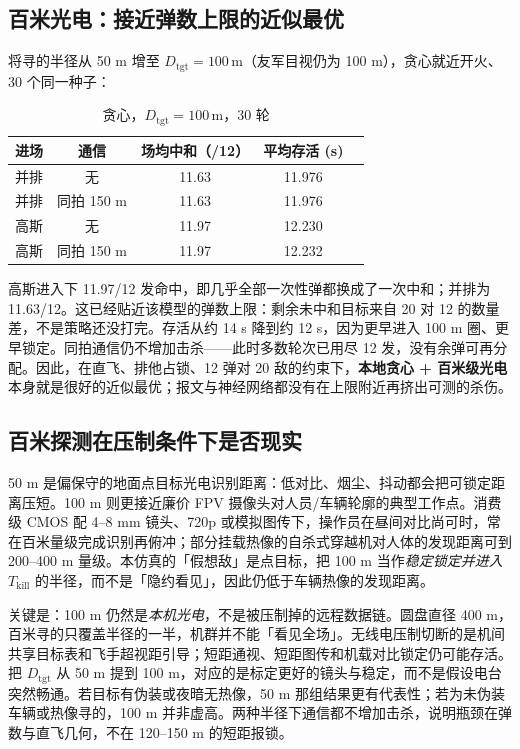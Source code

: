 \documentclass[12pt,a4paper]{article}
\begin{document}
\subsection{百米光电：接近弹数上限的近似最优}

将寻的半径从 50 m 增至 $D_{\mathrm{tgt}}=100\,\mathrm{m}$（友军目视仍为 100 m），贪心就近开火、30 个同一种子：

\begin{table}[H]
\centering
\caption{贪心，$D_{\mathrm{tgt}}=100\,\mathrm{m}$，30 轮}
\label{tab:d100}
\begin{tabular}{lcccc}
\toprule
进场 & 通信 & 场均中和（/12） & 平均存活 (s) \\
\midrule
并排 & 无 & 11.63 & 11.976 \\
并排 & 同拍 150 m & 11.63 & 11.976 \\
高斯 & 无 & 11.97 & 12.230 \\
高斯 & 同拍 150 m & 11.97 & 12.232 \\
\bottomrule
\end{tabular}
\end{table}

高斯进入下 11.97/12 发命中，即几乎全部一次性弹都换成了一次中和；并排为 11.63/12。这已经贴近该模型的弹数上限：剩余未中和目标来自 20 对 12 的数量差，不是策略还没打完。存活从约 14 s 降到约 12 s，因为更早进入 100 m 圈、更早锁定。同拍通信仍不增加击杀——此时多数轮次已用尽 12 发，没有余弹可再分配。因此，在直飞、排他占锁、12 弹对 20 敌的约束下，\textbf{本地贪心 + 百米级光电}本身就是很好的近似最优；报文与神经网络都没有在上限附近再挤出可测的杀伤。

\subsection{百米探测在压制条件下是否现实}

50 m 是偏保守的地面点目标光电识别距离：低对比、烟尘、抖动都会把可锁定距离压短。100 m 则更接近廉价 FPV 摄像头对人员/车辆轮廓的典型工作点。消费级 CMOS 配 4--8 mm 镜头、720p 或模拟图传下，操作员在昼间对比尚可时，常在百米量级完成识别再俯冲；部分挂载热像的自杀式穿越机对人体的发现距离可到 200--400 m 量级。本仿真的「假想敌」是点目标，把 100 m 当作\emph{稳定锁定并进入 $T_{\mathrm{kill}}$} 的半径，而不是「隐约看见」，因此仍低于车辆热像的发现距离。

关键是：100 m 仍然是\emph{本机光电}，不是被压制掉的远程数据链。圆盘直径 400 m，百米寻的只覆盖半径的一半，机群并不能「看见全场」。无线电压制切断的是机间共享目标表和飞手超视距引导；短距通视、短距图传和机载对比锁定仍可能存活。把 $D_{\mathrm{tgt}}$ 从 50 m 提到 100 m，对应的是标定更好的镜头与稳定，而不是假设电台突然畅通。若目标有伪装或夜暗无热像，50 m 那组结果更有代表性；若为未伪装车辆或热像寻的，100 m 并非虚高。两种半径下通信都不增加击杀，说明瓶颈在弹数与直飞几何，不在 120--150 m 的短距报锁。
\end{document}
